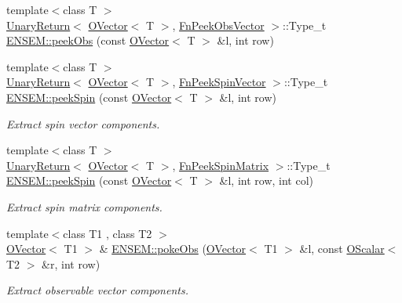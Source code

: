 \begin{DoxyCompactItemize}
\item 
{\footnotesize template$<$class T $>$ }\\\mbox{\hyperlink{structENSEM_1_1UnaryReturn}{Unary\+Return}}$<$ \mbox{\hyperlink{classENSEM_1_1OVector}{O\+Vector}}$<$ T $>$, \mbox{\hyperlink{structENSEM_1_1FnPeekObsVector}{Fn\+Peek\+Obs\+Vector}} $>$\+::Type\+\_\+t \mbox{\hyperlink{group__obsvector_ga8d085844df795594177550f3748fb6a5}{E\+N\+S\+E\+M\+::peek\+Obs}} (const \mbox{\hyperlink{classENSEM_1_1OVector}{O\+Vector}}$<$ T $>$ \&l, int row)
\item 
{\footnotesize template$<$class T $>$ }\\\mbox{\hyperlink{structENSEM_1_1UnaryReturn}{Unary\+Return}}$<$ \mbox{\hyperlink{classENSEM_1_1OVector}{O\+Vector}}$<$ T $>$, \mbox{\hyperlink{structENSEM_1_1FnPeekSpinVector}{Fn\+Peek\+Spin\+Vector}} $>$\+::Type\+\_\+t \mbox{\hyperlink{group__obsvector_ga53ddc54421a1f3fa7ee2ed55f15627a6}{E\+N\+S\+E\+M\+::peek\+Spin}} (const \mbox{\hyperlink{classENSEM_1_1OVector}{O\+Vector}}$<$ T $>$ \&l, int row)
\begin{DoxyCompactList}\small\item\em Extract spin vector components. \end{DoxyCompactList}\item 
{\footnotesize template$<$class T $>$ }\\\mbox{\hyperlink{structENSEM_1_1UnaryReturn}{Unary\+Return}}$<$ \mbox{\hyperlink{classENSEM_1_1OVector}{O\+Vector}}$<$ T $>$, \mbox{\hyperlink{structENSEM_1_1FnPeekSpinMatrix}{Fn\+Peek\+Spin\+Matrix}} $>$\+::Type\+\_\+t \mbox{\hyperlink{group__obsvector_gab454ed8a07dbd29bbb2851736c4635e6}{E\+N\+S\+E\+M\+::peek\+Spin}} (const \mbox{\hyperlink{classENSEM_1_1OVector}{O\+Vector}}$<$ T $>$ \&l, int row, int col)
\begin{DoxyCompactList}\small\item\em Extract spin matrix components. \end{DoxyCompactList}\item 
{\footnotesize template$<$class T1 , class T2 $>$ }\\\mbox{\hyperlink{classENSEM_1_1OVector}{O\+Vector}}$<$ T1 $>$ \& \mbox{\hyperlink{group__obsvector_gab682185c869b882a5be5eedf4fee8e74}{E\+N\+S\+E\+M\+::poke\+Obs}} (\mbox{\hyperlink{classENSEM_1_1OVector}{O\+Vector}}$<$ T1 $>$ \&l, const \mbox{\hyperlink{classENSEM_1_1OScalar}{O\+Scalar}}$<$ T2 $>$ \&r, int row)
\begin{DoxyCompactList}\small\item\em Extract observable vector components. \end{DoxyCompactList}\item 

\end{DoxyCompactItemize}
